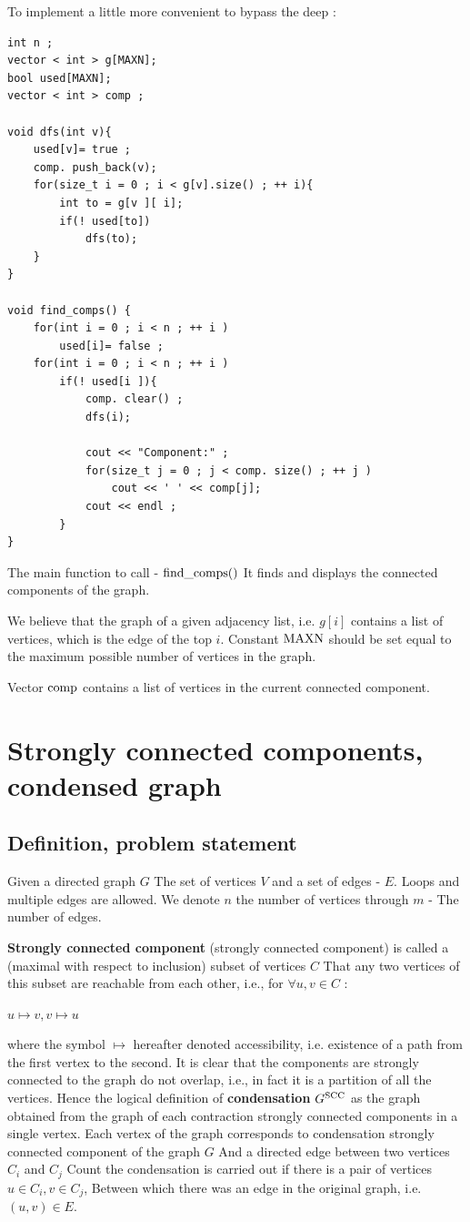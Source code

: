 To implement a little more convenient to bypass the deep :

\begin{verbatim}
int n ;
vector < int > g[MAXN];
bool used[MAXN];
vector < int > comp ;
 
void dfs(int v){
    used[v]= true ;
    comp. push_back(v);
    for(size_t i = 0 ; i < g[v].size() ; ++ i){
        int to = g[v ][ i];
        if(! used[to])
            dfs(to);
    }
}
 
void find_comps() {
    for(int i = 0 ; i < n ; ++ i )
        used[i]= false ;
    for(int i = 0 ; i < n ; ++ i )
        if(! used[i ]){
            comp. clear() ;
            dfs(i);
 
            cout << "Component:" ;
            for(size_t j = 0 ; j < comp. size() ; ++ j )
                cout << ' ' << comp[j];
            cout << endl ;
        }
} 
\end{verbatim}
The main function to call - $\rm find \_comps()$ It finds and displays the connected components of the graph.

We believe that the graph of a given adjacency list, i.e. $g [i]$ contains a list of vertices, which is the edge of the top $i$. Constant $\rm MAXN$ should be set equal to the maximum possible number of vertices in the graph.

Vector $\rm comp$ contains a list of vertices in the current connected component.

\section{ Strongly connected components, condensed graph }
\subsection{ Definition, problem statement }

Given a directed graph $G$ The set of vertices $V$ and a set of edges - $E$. Loops and multiple edges are allowed. We denote $n$ the number of vertices through $m$ - The number of edges.

\textbf{Strongly connected component} (strongly connected component) is called a (maximal with respect to inclusion) subset of vertices $C$ That any two vertices of this subset are reachable from each other, i.e., for $\forall u, v \in C$ :

$u \mapsto v, v \mapsto u$

where the symbol $\mapsto$ hereafter denoted accessibility, i.e. existence of a path from the first vertex to the second.
It is clear that the components are strongly connected to the graph do not overlap, i.e., in fact it is a partition of all the vertices. Hence the logical definition of \textbf{condensation} $G ^ {\rm SCC}$ as the graph obtained from the graph of each contraction strongly connected components in a single vertex. Each vertex of the graph corresponds to condensation strongly connected component of the graph $G$ And a directed edge between two vertices $C_i$ and $C_j$ Count the condensation is carried out if there is a pair of vertices $u \in C_i, v \in C_j$, Between which there was an edge in the original graph, i.e. $(u, v) \in E$.

